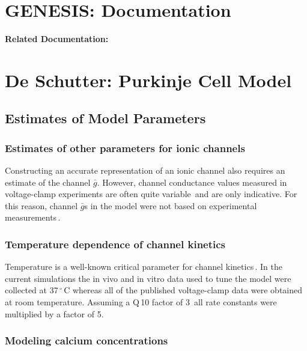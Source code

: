\documentclass[12pt]{article}
\begin{document}
\section*{GENESIS: Documentation}

{\bf Related Documentation:}

\section*{De Schutter: Purkinje Cell Model}

\subsection*{Estimates of Model Parameters}

\subsubsection*{Estimates of other parameters for ionic channels}

Constructing an accurate
representation of an ionic channel also requires an estimate of
the channel $\bar g$. However, channel conductance values measured in
voltage-clamp experiments are often quite variable\,\cite{McCormick:1992fk} and are only indicative. For this reason,
channel $\bar g$s in the model were not based on experimental measurements\,\cite{S:1993dz, De-Schutter-E:1993fu}.

\subsubsection*{Temperature dependence of channel kinetics}

Temperature is a well-known critical parameter for channel kinetics\,\cite{Hille:1991zr}.
In the current simulations the in vivo and in vitro data
used to tune the model were collected at 37\,$^\circ$\,C whereas all of the
published voltage-clamp data were obtained at room temperature.
Assuming a Q\,10 factor of 3\,\cite{L:1952fv} all rate constants were multiplied by a factor of 5.

\subsubsection*{Modeling calcium concentrations}
\end{document}
